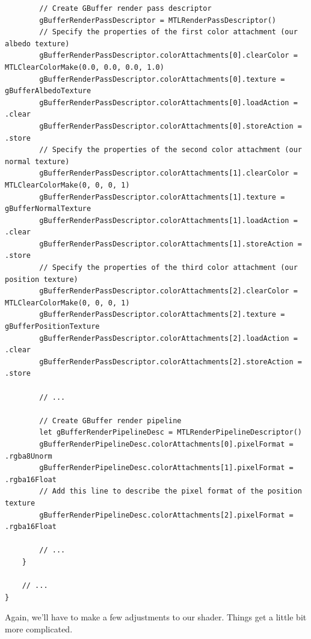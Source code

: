\documentclass[11pt]{article}
\begin{document}
\begin{verbatim}
        // Create GBuffer render pass descriptor
        gBufferRenderPassDescriptor = MTLRenderPassDescriptor()
        // Specify the properties of the first color attachment (our albedo texture)
        gBufferRenderPassDescriptor.colorAttachments[0].clearColor = MTLClearColorMake(0.0, 0.0, 0.0, 1.0)
        gBufferRenderPassDescriptor.colorAttachments[0].texture = gBufferAlbedoTexture
        gBufferRenderPassDescriptor.colorAttachments[0].loadAction = .clear
        gBufferRenderPassDescriptor.colorAttachments[0].storeAction = .store
        // Specify the properties of the second color attachment (our normal texture)
        gBufferRenderPassDescriptor.colorAttachments[1].clearColor = MTLClearColorMake(0, 0, 0, 1)
        gBufferRenderPassDescriptor.colorAttachments[1].texture = gBufferNormalTexture
        gBufferRenderPassDescriptor.colorAttachments[1].loadAction = .clear
        gBufferRenderPassDescriptor.colorAttachments[1].storeAction = .store
        // Specify the properties of the third color attachment (our position texture)
        gBufferRenderPassDescriptor.colorAttachments[2].clearColor = MTLClearColorMake(0, 0, 0, 1)
        gBufferRenderPassDescriptor.colorAttachments[2].texture = gBufferPositionTexture
        gBufferRenderPassDescriptor.colorAttachments[2].loadAction = .clear
        gBufferRenderPassDescriptor.colorAttachments[2].storeAction = .store

        // ...

        // Create GBuffer render pipeline
        let gBufferRenderPipelineDesc = MTLRenderPipelineDescriptor()
        gBufferRenderPipelineDesc.colorAttachments[0].pixelFormat = .rgba8Unorm
        gBufferRenderPipelineDesc.colorAttachments[1].pixelFormat = .rgba16Float
        // Add this line to describe the pixel format of the position texture
        gBufferRenderPipelineDesc.colorAttachments[2].pixelFormat = .rgba16Float

        // ...
    }

    // ...
}
\end{verbatim}

Again, we'll have to make a few adjustments to our shader. Things get a little bit more complicated.
\end{document}
